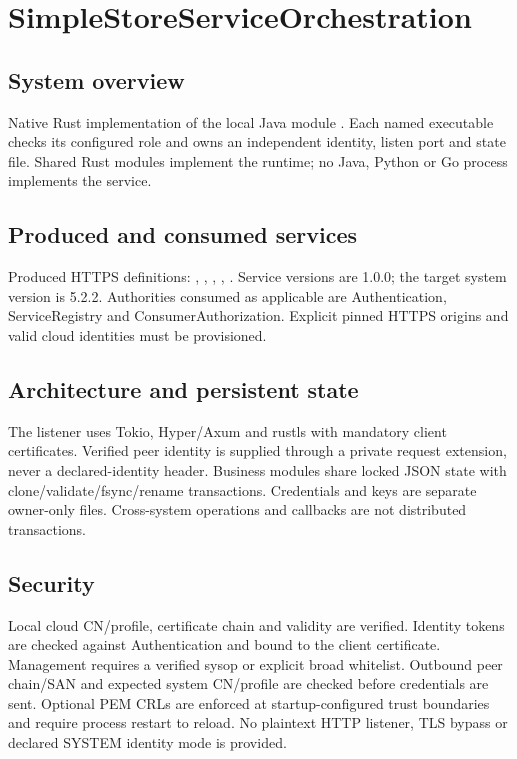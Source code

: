 \documentclass[a4paper]{arrowhead}
\begin{document}
\ArrowheadSetup
\section{SimpleStoreServiceOrchestration}
\subsection{System overview}
Native Rust implementation of the local Java module . Each named executable checks its configured role and owns an independent identity, listen port and state file. Shared Rust modules implement the runtime; no Java, Python or Go process implements the service.
\subsection{Produced and consumed services}
Produced HTTPS definitions: , \allowbreak {}, \allowbreak {}, \allowbreak {}, \allowbreak {}. Service versions are 1.0.0; the target system version is 5.2.2. Authorities consumed as applicable are Authentication, ServiceRegistry and ConsumerAuthorization. Explicit pinned HTTPS origins and valid cloud identities must be provisioned.
\subsection{Architecture and persistent state}
The listener uses Tokio, Hyper/Axum and rustls with mandatory client certificates. Verified peer identity is supplied through a private request extension, never a declared-identity header. Business modules share locked JSON state with clone/validate/fsync/rename transactions. Credentials and keys are separate owner-only files. Cross-system operations and callbacks are not distributed transactions.
\subsection{Security}
Local cloud CN/profile, certificate chain and validity are verified. Identity tokens are checked against Authentication and bound to the client certificate. Management requires a verified sysop or explicit broad whitelist. Outbound peer chain/SAN and expected system CN/profile are checked before credentials are sent. Optional PEM CRLs are enforced at startup-configured trust boundaries and require process restart to reload. No plaintext HTTP listener, TLS bypass or declared SYSTEM identity mode is provided.
\end{document}
